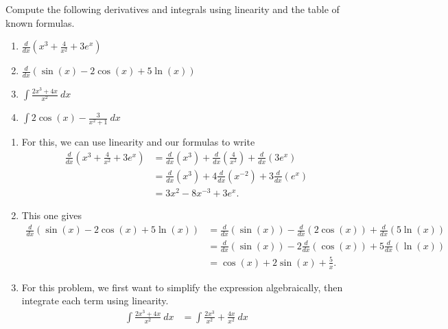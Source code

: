 \documentclass{ximera}
\begin{document}
\begin{example}
    Compute the following derivatives and integrals using linearity and the table of known formulas.
    \begin{enumerate}
        \item $\frac{d}{dx}\left(x^3 + \frac{4}{x^2} + 3e^{x} \right)$
        \item $\frac{d}{dx}\left( \sin(x) - 2\cos(x) + 5\ln(x) \right)$
        \item $\int \frac{2x^3 + 4x}{x^2}\ dx$
        \item $\int 2\cos(x) - \frac{3}{x^2 + 1}\ dx$
    \end{enumerate}
\end{example}
\begin{exampleSol}
    \begin{enumerate}
        \item For this, we can use linearity and our formulas to write
            \[ 
                \begin{split}
                    \frac{d}{dx}\left(x^3 + \frac{4}{x^2} + 3e^{x} \right) &= \frac{d}{dx}\left( x^3 \right) + \frac{d}{dx}\left(\frac{4}{x^2} \right) + \frac{d}{dx}\left(3e^x \right) \\
                    &= \frac{d}{dx}\left( x^3\right) + 4\frac{d}{dx}\left( x^{-2}\right) + 3\frac{d}{dx}\left( e^x\right) \\
                    &= 3x^2 - 8x^{-3} + 3e^x.
                \end{split} 
            \]
        \item This one gives
            \[ 
                \begin{split}
                    \frac{d}{dx}\left( \sin(x) - 2\cos(x) + 5\ln(x) \right) &= \frac{d}{dx}\left( \sin(x)\right) - \frac{d}{dx}\left(2 \cos(x) \right) + \frac{d}{dx}\left( 5\ln(x)\right) \\ 
                    &= \frac{d}{dx}\left( \sin(x)\right) - 2\frac{d}{dx}\left(\cos(x) \right) + 5\frac{d}{dx}\left( \ln(x)\right) \\
                    &= \cos(x) + 2\sin(x) + \frac{5}{x}.
                \end{split} 
            \]
        \item For this problem, we first want to simplify the expression algebraically, then integrate each term using linearity.
            \[ 
                \begin{split}
                    \int \frac{2x^3 + 4x}{x^2}\ dx &= \int \frac{2x^3}{x^2} + \frac{4x}{x^2}\ dx \\

\end{split}\]
\end{enumerate}
\end{exampleSol}
\end{document}

